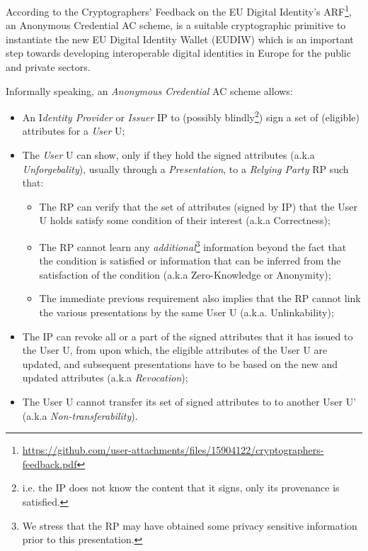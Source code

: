 According to the Cryptographers' Feedback on the EU Digital Identity’s ARF\footnote{\url{https://github.com/user-attachments/files/15904122/cryptographers-feedback.pdf}}, an Anonymous Credential AC scheme, is a suitable cryptographic primitive to instantiate the new EU Digital Identity Wallet (EUDIW) which is an important step towards developing interoperable digital identities in Europe for the public and private sectors.

\begin{framed}\footnotesize
	Informally speaking, an \emph{Anonymous Credential} AC scheme allows:
	\begin{itemize}
		\item An I\emph{dentity Provider} or \emph{Issuer} IP to (possibly blindly\footnote{i.e. the IP does not know the content that it signs, only its provenance is satisfied.}) sign a set of (eligible) attributes for a \emph{User} U;
		\item The \emph{User} U can show, only if they hold the signed attributes (a.k.a \emph{Unforgebality}), usually through a \emph{Presentation}, to a \emph{Relying Party} RP such that:
		\begin{itemize}
			\item The RP can verify that the set of attributes (signed by IP) that the User U holds satisfy some condition of their interest (a.k.a Correctness);
			\item The RP cannot learn any \emph{additional}\footnote{We stress that the RP may have obtained some privacy sensitive information prior to this presentation.} information beyond the fact that the condition is satisfied or information that can be inferred from the satisfaction of the condition (a.k.a Zero-Knowledge or Anonymity);
			\item The immediate previous requirement also implies that the RP cannot link the various presentations by the same User U (a.k.a. Unlinkability);
		\end{itemize}
		\item The IP can revoke all or a part of the signed attributes that it has issued to the User U, from upon which, the eligible attributes of the User U are updated, and subsequent presentations have to be based on the new and updated attributes (a.k.a \emph{Revocation});
		\item The User U cannot transfer its set of signed attributes to to another User U' (a.k.a \emph{Non-transferability}).
	\end{itemize}
\end{framed}


